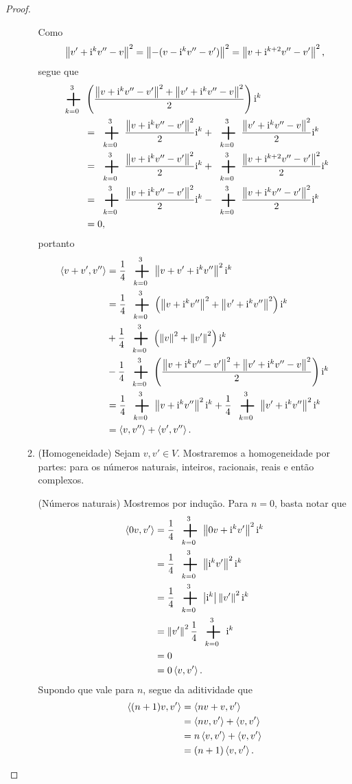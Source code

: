 \begin{proof}
\begin{enumerate}
\begin{enumerate}
	Como
		\begin{equation*}
		\left\Vert{v'+\mathrm{i}^kv''-v}\right\Vert^2 = \left\Vert{-(v-\mathrm{i}^kv''-v')}\right\Vert^2 = \left\Vert{v+\mathrm{i}^{k+2}v''-v'}\right\Vert^2,
		\end{equation*}
	segue que
		\begin{align*}
		\sum_{k=0}^{3} &\left(\frac{\nor{v+\ii^kv''-v'}^2 + \nor{v'+\ii^kv''-v}^2}{2}\right)\ii^k \\
		&= \sum_{k=0}^{3} \frac{\nor{v+\ii^kv''-v'}^2}{2}\ii^k + \sum_{k=0}^{3} \frac{\nor{v'+\ii^kv''-v}^2}{2}\ii^k \\
		&= \sum_{k=0}^{3} \frac{\nor{v+\ii^kv''-v'}^2}{2}\ii^k + \sum_{k=0}^{3} \frac{\nor{v+\ii^{k+2}v''-v'}^2}{2}\ii^k \\
		&= \sum_{k=0}^{3} \frac{\nor{v+\ii^kv''-v'}^2}{2}\ii^k - \sum_{k=0}^{3} \frac{\nor{v+\ii^kv''-v'}^2}{2}\ii^k \\
		&=0,
		\end{align*}
	portanto
		\begin{align*}
		\inte{v+v'}{v''} &= \frac{1}{4} \sum_{k=0}^{3} \nor{v+v'+\ii^kv''}^2 \ii^k \\
			&= \frac{1}{4} \sum_{k=0}^{3} \left(\nor{v+\ii^kv''}^2 + \nor{v'+\ii^kv''}^2\right)\ii^k \\
			&+ \frac{1}{4} \sum_{k=0}^{3} \left(\nor{v}^2 + \nor{v'}^2\right)\ii^k \\
			&- \frac{1}{4} \sum_{k=0}^{3} \left(\frac{\nor{v+\ii^kv''-v'}^2 + \nor{v'+\ii^kv''-v}^2}{2}\right)\ii^k \\
			&= \frac{1}{4} \sum_{k=0}^{3} \nor{v+\ii^kv''}^2\ii^k + \frac{1}{4} \sum_{k=0}^{3} \nor{v'+\ii^kv''}^2\ii^k \\
			&= \inte{v}{v''} + \inte{v'}{v''}.
		\end{align*}
	
	\item (Homogeneidade) Sejam $v,v' \in V$. Mostraremos a homogeneidade por partes: para os números naturais, inteiros, racionais, reais e então complexos.
	
	(Números naturais) Mostremos por indução. Para $n=0$, basta notar que
		\begin{align*}
		\inte{0v}{v'} &= \frac{1}{4} \sum_{k=0}^{3} \nor{0v+\ii^kv'}^2 \ii^k \\
			&= \frac{1}{4} \sum_{k=0}^{3} \nor{\ii^kv'}^2 \ii^k \\
			&= \frac{1}{4} \sum_{k=0}^{3} \abs{\ii^k}\nor{v'}^2 \ii^k \\
			&= \nor{v'}^2\frac{1}{4} \sum_{k=0}^{3} \ii^k \\
			&= 0 \\
			&= 0 \inte{v}{v'}.
		\end{align*}
	Supondo que vale para $n$, segue da aditividade que
		\begin{align*}
		\left\langle{(n+1)v},{v'}\right\rangle &= \left\langle{nv+v},{v'}\right\rangle \\
			&= \left\langle{nv},{v'}\right\rangle + \left\langle{v},{v'}\right\rangle \\
			&= n\left\langle{v},{v'}\right\rangle + \left\langle{v},{v'}\right\rangle \\
			&= (n+1)\left\langle{v},{v'}\right\rangle.
		\end{align*}
	

\end{enumerate}
\end{enumerate}
\end{proof}
